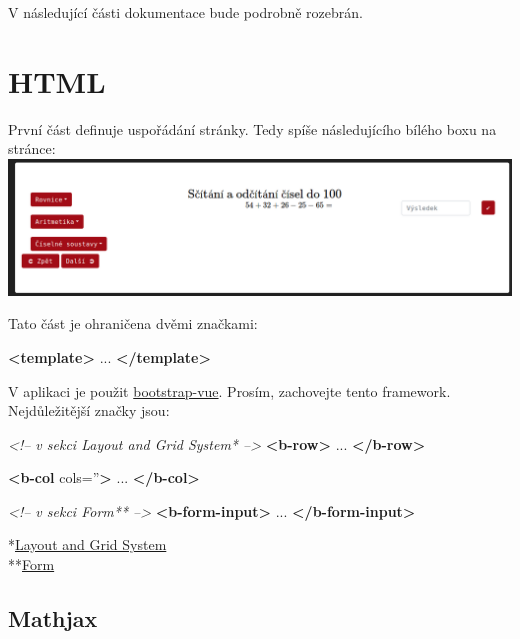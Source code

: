 \documentclass[
]{article}
\newenvironment{Shaded}{}{}
\newcommand{\CommentTok}[1]{\textcolor[rgb]{0.38,0.63,0.69}{\textit{#1}}}
\newcommand{\KeywordTok}[1]{\textcolor[rgb]{0.00,0.44,0.13}{\textbf{#1}}}
\newcommand{\NormalTok}[1]{#1}
\newcommand{\OtherTok}[1]{\textcolor[rgb]{0.00,0.44,0.13}{#1}}
\newcommand{\StringTok}[1]{\textcolor[rgb]{0.25,0.44,0.63}{#1}}
\begin{document}
V následující části dokumentace bude podrobně rozebrán.\\

\hypertarget{html}{%
\section{HTML}\label{html}}

První část definuje uspořádání stránky. Tedy spíše následujícího bílého
boxu na stránce:\\
\includegraphics{../doc-images/WhiteBox.png}

Tato část je ohraničena dvěmi značkami:

\begin{Shaded}
\begin{Highlighting}[]
\KeywordTok{<template>}
\NormalTok{    ...}
\KeywordTok{</template>}
\end{Highlighting}
\end{Shaded}

V aplikaci je použit
\href{https://bootstrap-vue.js.org/docs}{bootstrap-vue}. Prosím,
zachovejte tento framework. Nejdůležitější značky jsou:

\begin{Shaded}
\begin{Highlighting}[]
\CommentTok{<!-- v sekci Layout and Grid System* -->}
\KeywordTok{<b-row>}
\NormalTok{    ...}
\KeywordTok{</b-row>}

\KeywordTok{<b-col}\OtherTok{ cols=}\StringTok{''}\KeywordTok{>}
\NormalTok{    ...}
\KeywordTok{</b-col>}

\CommentTok{<!-- v sekci Form** -->}
\KeywordTok{<b-form-input>}
\NormalTok{    ...}
\KeywordTok{</b-form-input>}
\end{Highlighting}
\end{Shaded}

*\href{https://bootstrap-vue.js.org/docs/components/layout}{Layout and
Grid System}\\
**\href{https://bootstrap-vue.js.org/docs/components/form}{Form}

\hypertarget{mathjax}{%
\subsection{Mathjax}\label{mathjax}}
\end{document}
